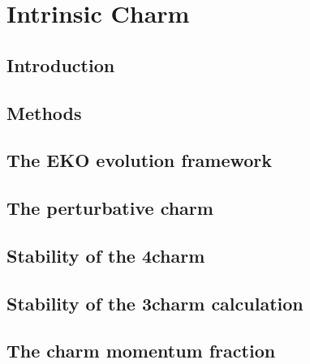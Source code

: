 
\chapter{Intrinsic Charm}
\label{ch:ic}
\minitoc
\adjustmtc



\section{Introduction}
\label{sec:ic/intro}


\section{Methods}
\label{sec:ic/methods}


\section{The EKO evolution framework}
\label{sec:ic/eko}


\section{The perturbative charm \pdf}
\label{sec:ic/consistency}


\section{Stability of the 4\fns charm \pdf}
\label{sec:ic/charm_stability_4fns}


\section{Stability of the 3\fns charm calculation}
\label{sec:ic/charm_stability_3fns}


\section{The charm momentum fraction}
\label{sec:ic/charm_mom_frac}



